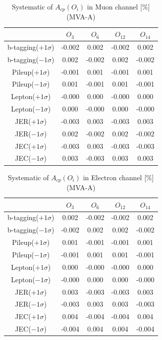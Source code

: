 		\begin{center}
		\setlength{\tabcolsep}{12pt}
		\begin{longtable}{ | c | c c c c | }
		\caption{Systematic of $A_{cp}(O_i)$ in Muon channel [\%] (MVA-A)}\\
		\hline
		 [\%] & $O_3$ & $O_6$ & $O_{12}$ & $O_{14}$ \\
		\hline
		b-tagging($+1\sigma$) & -0.002 & 0.002 & -0.002 & 0.002 \\
		b-tagging($-1\sigma$) & 0.002 & -0.002 & 0.002 & -0.002 \\
		\hline
		Pileup($+1\sigma$) & -0.001 & 0.001 & -0.001 & 0.001 \\
		Pileup($-1\sigma$) & 0.001 & -0.001 & 0.001 & -0.001 \\
		\hline
		Lepton($+1\sigma$) & -0.000 & 0.000 & -0.000 & 0.000 \\
		Lepton($-1\sigma$) & 0.000 & -0.000 & 0.000 & -0.000 \\
		\hline
		JER($+1\sigma$) & -0.003 & 0.003 & -0.003 & 0.003 \\
		JER($-1\sigma$) & 0.002 & -0.002 & 0.002 & -0.002 \\
		\hline
		JEC($+1\sigma$) & -0.003 & 0.003 & -0.003 & -0.003 \\
		JEC($-1\sigma$) & 0.003 & -0.003 & 0.003 & 0.003 \\
		\hline
		\end{longtable}
		\end{center}

		\begin{center}
		\setlength{\tabcolsep}{12pt}
		\begin{longtable}{ | c | c c c c | }
		\caption{Systematic of $A_{cp}(O_i)$ in Electron channel [\%] (MVA-A)}\\
		\hline
		 [\%] & $O_3$ & $O_6$ & $O_{12}$ & $O_{14}$ \\
		\hline
		b-tagging($+1\sigma$) & 0.002 & -0.002 & -0.002 & 0.002 \\
		b-tagging($-1\sigma$) & -0.002 & 0.002 & 0.002 & -0.002 \\
		\hline
		Pileup($+1\sigma$) & 0.001 & -0.001 & -0.001 & 0.001 \\
		Pileup($-1\sigma$) & -0.001 & 0.001 & 0.001 & -0.001 \\
		\hline
		Lepton($+1\sigma$) & 0.000 & -0.000 & -0.000 & 0.000 \\
		Lepton($-1\sigma$) & -0.000 & 0.000 & 0.000 & -0.000 \\
		\hline
		JER($+1\sigma$) & 0.003 & -0.003 & -0.003 & 0.003 \\
		JER($-1\sigma$) & -0.003 & 0.003 & 0.003 & -0.003 \\
		\hline
		JEC($+1\sigma$) & 0.004 & -0.004 & -0.004 & 0.004 \\
		JEC($-1\sigma$) & -0.004 & 0.004 & 0.004 & -0.004 \\
		\hline
		\end{longtable}
		\end{center}


